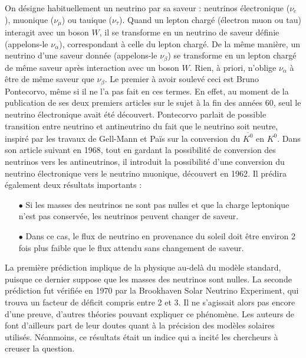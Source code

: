             On désigne habituellement un neutrino par sa saveur : neutrinos électronique ($\nu_e$), muonique ($\nu_{\mu}$) ou tauique ($\nu_{\tau}$). Quand un lepton chargé (électron muon ou tau) interagit avec un boson $W$, il se transforme en un neutrino de saveur définie (appelons-le $\nu_{\alpha}$), correspondant à celle du lepton chargé. De la même manière, un neutrino d'une saveur donnée (appelons-le $\nu_{\beta}$) se transforme en un lepton chargé de même saveur après interaction avec un boson $W$. Rien, à priori, n'oblige $\nu_{\alpha}$ à être de même saveur que $\nu_{\beta}$. Le premier à avoir soulevé ceci est Bruno Pontecorvo, même si il ne l'a pas fait en ces termes. En effet, au moment de la publication de ses deux premiers articles\cite{Pontecorvo:1957cp,Pontecorvo:1957qd} sur le sujet à la fin des années 60, seul le neutrino électronique avait été découvert. Pontecorvo parlait de possible transition entre neutrino et antineutrino du fait que le neutrino soit neutre, inspiré par les travaux de Gell-Mann et Païs\cite{Gell-Mann1955} sur la conversion du $\overline{K^0}$ en  $K^0$. Dans son article suivant en 1968\cite{Pontecorvo1968}, tout en gardant la possibilité de conversion des neutrinos vers les antineutrinos, il introduit la possibilité d'une conversion du neutrino électronique vers le neutrino muonique, découvert en 1962\cite{Danby1962}. Il prédira également deux résultats importants :
            \begin{itemize}
                \item[$\bullet$] Si les masses des neutrinos ne sont pas nulles et que la charge leptonique n'est pas conservée, les neutrinos peuvent changer de saveur.
                \item[$\bullet$] Dans ce cas, le flux de neutrino en provenance du soleil doit être environ 2 fois plus faible que le flux attendu sans changement de saveur.
            \end{itemize}
            La première prédiction implique de la physique au-delà du modèle standard, puisque ce dernier suppose que les masses des neutrinos sont nulles. La seconde prédiction fut vérifiée en 1970 par la Brookhaven Solar Neutrino Experiment\cite{Bahcall1976}, qui trouva un facteur de déficit compris entre 2 et 3. Il ne s'agissait alors pas encore d'une preuve, d'autres théories pouvant expliquer ce phénomène. Les auteurs de \cite{Bahcall1976} font d'ailleurs part de leur doutes quant à la précision des modèles solaires utilisés. Néanmoins, ce résultats était un indice qui a incité les chercheurs à creuser la question.
            

